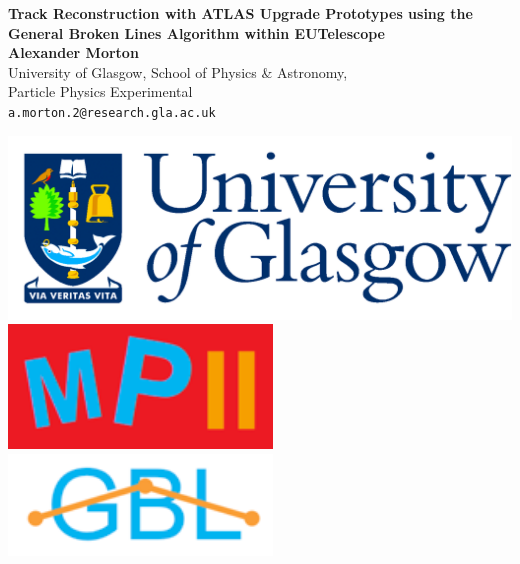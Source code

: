 \documentclass[a0,portrait]{a0poster}
\begin{document}
\newcommand{\bra}[1]{\langle #1|}

\newcommand{\ket}[1]{|#1\rangle}

\newcommand{\braket}[2]{\langle #1|#2\rangle}



\begin{minipage}[b]{0.75\linewidth}
\veryHuge \color{NavyBlue} \textbf{Track Reconstruction with ATLAS Upgrade Prototypes using the General Broken Lines Algorithm within EUTelescope} \color{Black}\\ \vspace{1cm} %
\huge \textbf{Alexander Morton}\\[0.5cm] %
\huge University of Glasgow, School of Physics \& Astronomy, \\ Particle Physics Experimental\\[0.4cm] %
\Large \texttt{a.morton.2@research.gla.ac.uk}
\end{minipage}
%
\begin{minipage}[b]{0.25\linewidth}
\includegraphics[width=20cm]{GlaUni.png}\\
\includegraphics[width=7cm]{mp2-logo.png} \hspace{3cm} \includegraphics[width=7cm]{gbl-logo.png}\\
\end{minipage}
\end{document}
